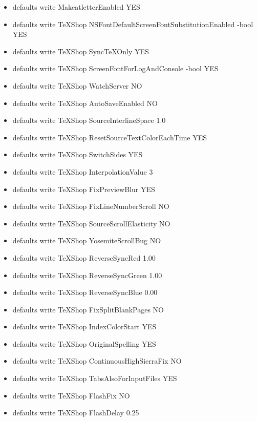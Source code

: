 \documentclass[11pt, oneside]{article}   	%
\begin{document}
\begin{itemize}
\item defaults write MakeatletterEnabled YES
\item defaults write TeXShop NSFontDefaultScreenFontSubstitutionEnabled -bool YES
\item defaults write TeXShop SyncTeXOnly YES
\item defaults write TeXShop ScreenFontForLogAndConsole -bool YES
\item defaults write TeXShop WatchServer NO
\item defaults write TeXShop AutoSaveEnabled NO
\item defaults write TeXShop SourceInterlineSpace 1.0
\item defaults write TeXShop ResetSourceTextColorEachTime YES
\item defaults write TeXShop SwitchSides YES
\item defaults write TeXShop InterpolationValue 3
\item defaults write TeXShop FixPreviewBlur YES
\item defaults write TeXShop FixLineNumberScroll NO
\item defaults write TeXShop SourceScrollElasticity NO
\item defaults write TeXShop YosemiteScrollBug NO
\item defaults write TeXShop ReverseSyncRed 1.00 
\item defaults write TeXShop ReverseSyncGreen 1.00 
\item defaults write TeXShop ReverseSyncBlue 0.00
\item defaults write TeXShop FixSplitBlankPages NO
\item defaults write TeXShop IndexColorStart YES
\item defaults write TeXShop OriginalSpelling YES
\item defaults write TeXShop ContinuousHighSierraFix NO
\item defaults write TeXShop TabsAlsoForInputFiles YES
\item defaults write TeXShop FlashFix NO
\item defaults write TeXShop FlashDelay 0.25
\end{itemize}
\end{document}

